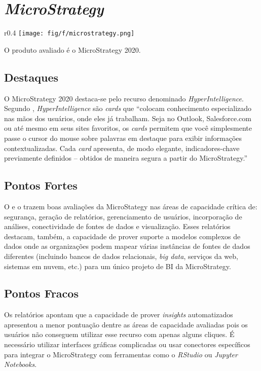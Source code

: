 \section{\emph{MicroStrategy}}
\label{sub-microstrategy}

\begin{wrapfigure}[3]{r}{0.4\textwidth}     
    \centering
    \texttt{[image: fig/f/microstrategy.png]}
\end{wrapfigure}

O produto avaliado é o MicroStrategy 2020.

\subsection*{Destaques}

O MicroStrategy 2020 destaca-se pelo recurso denominado \emph{HyperIntelligence}. Segundo \cite{microstrategy:hyper}, \emph{HyperIntelligence} são \emph{cards} que ``colocam conhecimento especializado nas mãos dos usuários, onde eles já trabalham. Seja no Outlook, Salesforce.com ou até mesmo em seus sites favoritos, os \emph{cards} permitem que você simplesmente passe o cursor do mouse sobre palavras em destaque para exibir informações contextualizadas. Cada \emph{card} apresenta, de modo elegante, indicadores-chave previamente definidos – obtidos de maneira segura a partir do MicroStrategy.''

\subsection*{Pontos Fortes}

O \relGMQ \xspace e o \relGCC \xspace trazem boas avaliações da MicroStategy nas áreas de capacidade crítica de: segurança, geração de relatórios, gerenciamento de usuários, incorporação de análises, conectividade de fontes de dados e visualização. Esses relatórios destacam, também, a capacidade de prover suporte a modelos complexos de dados onde as organizações podem mapear várias instâncias de fontes de dados diferentes (incluindo bancos de dados relacionais, \emph{big data}, serviços da web, sistemas em nuvem, etc.) para um único projeto de BI da MicroStrategy. 

\subsection*{Pontos Fracos}

Os relatórios apontam que a capacidade de prover \emph{insights} automatizados apresentou a menor pontuação dentre as áreas de capacidade avaliadas pois os usuários não conseguem utilizar esse recurso com apenas alguns cliques. É necessário utilizar interfaces gráficas complicadas ou usar conectores específicos para integrar o MicroStrategy com ferramentas como o \emph{RStudio} ou \emph{Jupyter Notebooks}.

